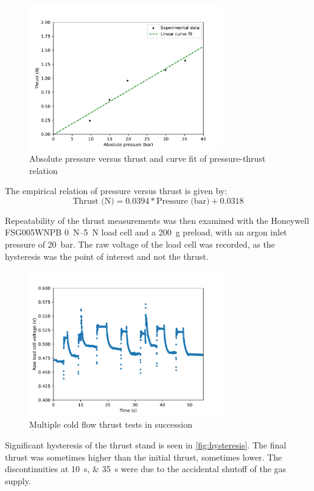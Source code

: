             \begin{figure}[!ht]
                \centering
                \includegraphics[width=0.75\textwidth]{assets/4 experiments/pressure-thrust graph.pdf}
                \caption{Absolute pressure versus thrust and curve fit of pressure-thrust relation}
                \label{fig:coldflow pressure-thrust}
            \end{figure}

            The empirical relation of pressure versus thrust is given by:
            \[
            \text{Thrust (N)} = 0.0394*\text{Pressure (bar)} + 0.0318
            \]

            Repeatability of the thrust measurements was then examined with the Honeywell FSG005WNPB \qtyrange{0}{5}{N} load cell and a \qty{200}{g} preload, with an argon inlet pressure of \qty{20}{bar}. The raw voltage of the load cell was recorded, as the hysteresis was the point of interest and not the thrust.
            \begin{figure}[h]
                \centering
                \includegraphics[width=0.75\textwidth]{assets/4 experiments/hysterisis graph.pdf}
                \caption{Multiple cold flow thrust tests in succession}
                \label{fig:hysteresis}
            \end{figure}
            Significant hysteresis of the thrust stand is seen in \autoref{fig:hysteresis}. The final thrust was sometimes higher than the initial thrust, sometimes lower. The discontinuities at \qtylist{10;35}{s} were due to the accidental shutoff of the gas supply.

